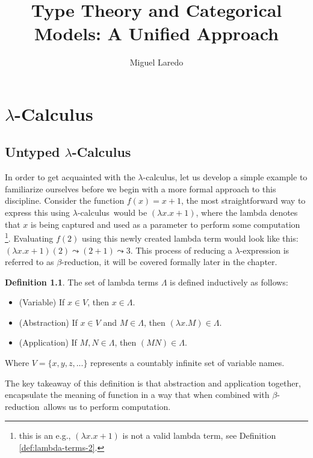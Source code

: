 \documentclass[12pt]{book}
\title{Type Theory and Categorical Models: A Unified Approach}
\author{Miguel Laredo}
\newcommand{\la}{\lambda}
\newcommand{\La}{\Lambda}
\newcommand{\Vset}{V}
\newcommand{\lCalc}{$\la$-Calculus}
\newcommand{\lcalc}{$\la$-calculus}
\newcommand{\bred}{$\beta$-reduction}
\newcommand{\curly}{\mathrel{\leadsto}}
\theoremstyle{plain}
\theoremstyle{definition}
\newtheorem{definition}{Definition}[section]
\theoremstyle{definition}
\theoremstyle{definition}
\begin{document}
\chapter{\lCalc}

\section{\centering Untyped \lCalc}
In order to get acquainted with the \lcalc, let us develop a simple example to familiarize ourselves before we begin with a more formal approach to this discipline. Consider the function $f(x) = x + 1$, the most straightforward way to express this using \lcalc \ would be $(\la x . x + 1 )$, where the lambda denotes that $x$ is being captured and used as a parameter to perform some computation \footnote{this is an e.g., $(\la x . x + 1 )$ is not a valid lambda term, see Definition \ref{def:lambda-terms-2}.}. Evaluating $f(2)$ using this newly created lambda term would look like this: $(\la x . x + 1)(2) \curly (2 + 1) \curly 3$. This process of reducing a $\la$-expression is referred to as \bred, it will be covered formally later in the chapter.
\begin{definition} The set of lambda terms \( \La \) is defined inductively as follows:
  \label{def:lambda-terms-1}
  \begin{itemize}
  \item (Variable) If \( x \in \Vset \), then \( x \in \La \).  
  \item (Abstraction) If \( x \in \Vset \) and \( M \in \La \), then \( (\la x. M) \in \La \).
  \item (Application) If \( M, N \in \La \), then \((M N) \in \La \).
  \end{itemize}
  Where $\Vset = \{x, y, z, ... \}$ represents a countably infinite set of variable names.
\end{definition}
The key takeaway of this definition is that abstraction and application together, encapsulate the meaning of function in a way that when combined with \bred \ allows us to perform computation.
\end{document}
